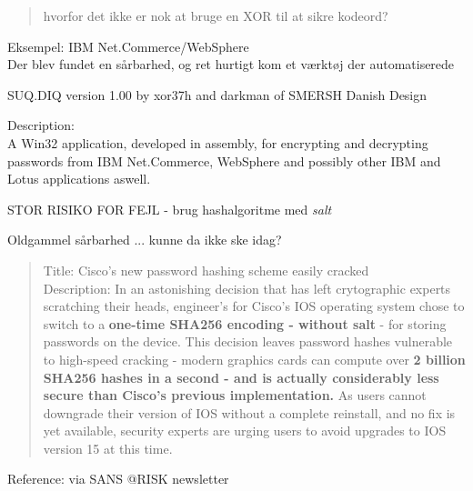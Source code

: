 \documentclass[20pt,landscape,a4paper,footrule]{foils}
\begin{document}

\begin{quote}
hvorfor det ikke er nok at bruge en XOR til at sikre kodeord?
\end{quote}

\pause
\begin{list1}
\item Eksempel: IBM Net.Commerce/WebSphere\\
Der blev fundet en sårbarhed, og ret
hurtigt kom et værktøj der automatiserede
\item SUQ.DIQ version 1.00
by xor37h and darkman of SMERSH
Danish Design

\item Description:\\
A Win32 application, developed in assembly, for encrypting and decrypting
passwords from IBM Net.Commerce, WebSphere and possibly other IBM and Lotus applications
 aswell.
\item {}
\item STOR RISIKO FOR FEJL - brug hashalgoritme med \emph{salt}
\end{list1}

\vskip 1cm
\centerline{\Large Oldgammel sårbarhed ... kunne da ikke ske idag?}


\begin{quote}
Title: Cisco's new password hashing scheme easily cracked\\

Description: In an astonishing decision that has left crytographic
experts scratching their heads, engineer's for Cisco's IOS operating
system chose to switch to a {\bf one-time SHA256 encoding - without salt} -
for storing passwords on the device. This decision leaves password
hashes vulnerable to high-speed cracking - modern graphics cards can
compute over {\bf 2 billion SHA256 hashes in a second - and is actually
considerably less secure than Cisco's previous implementation.} As users
cannot downgrade their version of IOS without a complete reinstall, and
no fix is yet available, security experts are urging users to avoid
upgrades to IOS version 15 at this time.
\end{quote}

Reference: via SANS @RISK newsletter\\
\end{document}
